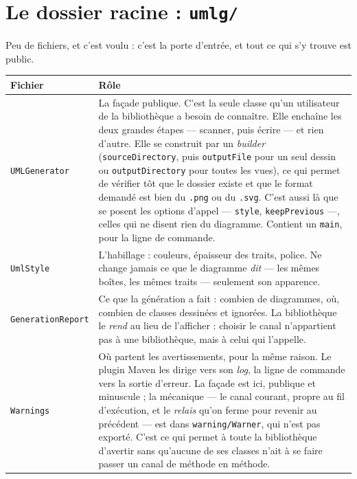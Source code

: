\documentclass[12pt, a4paper]{article}
\begin{document}
\section{Le dossier racine : \texttt{umlg/}}

Peu de fichiers, et c'est voulu : c'est la porte d'entrée, et tout ce qui s'y trouve est public.

\begin{longtable}{L{4.2cm} L{10cm}}
\toprule
\textbf{Fichier} & \textbf{Rôle} \\
\midrule
\endhead
\texttt{UMLGenerator} &
La façade publique. C'est la seule classe qu'un utilisateur de la bibliothèque a besoin de
connaître. Elle enchaîne les deux grandes étapes — scanner, puis écrire — et rien d'autre.
Elle se construit par un \emph{builder} (\texttt{sourceDirectory}, puis \texttt{outputFile} pour
un seul dessin ou \texttt{outputDirectory} pour toutes les vues), ce qui permet de vérifier tôt
que le dossier existe et que le format demandé est bien du \texttt{.png} ou du \texttt{.svg}.
C'est aussi là que se posent les options d'appel — \texttt{style}, \texttt{keepPrevious} —, celles
qui ne disent rien du diagramme. Contient un \texttt{main}, pour la ligne de commande. \\
\addlinespace
\texttt{UmlStyle} &
L'habillage : couleurs, épaisseur des traits, police. Ne change jamais ce que le diagramme
\emph{dit} — les mêmes boîtes, les mêmes traits — seulement son apparence. \\
\addlinespace
\texttt{GenerationReport} &
Ce que la génération a fait : combien de diagrammes, où, combien de classes dessinées et
ignorées. La bibliothèque le \emph{rend} au lieu de l'afficher : choisir le canal n'appartient
pas à une bibliothèque, mais à celui qui l'appelle. \\
\addlinespace
\texttt{Warnings} &
Où partent les avertissements, pour la même raison. Le plugin Maven les dirige vers son
\emph{log}, la ligne de commande vers la sortie d'erreur. La façade est ici, publique et
minuscule ; la mécanique — le canal courant, propre au fil d'exécution, et le \emph{relais}
qu'on ferme pour revenir au précédent — est dans \texttt{warning/Warner}, qui n'est pas
exporté. C'est ce qui permet à toute la bibliothèque d'avertir sans qu'aucune de ses classes
n'ait à se faire passer un canal de méthode en méthode. \\
\bottomrule
\end{longtable}
\end{document}
